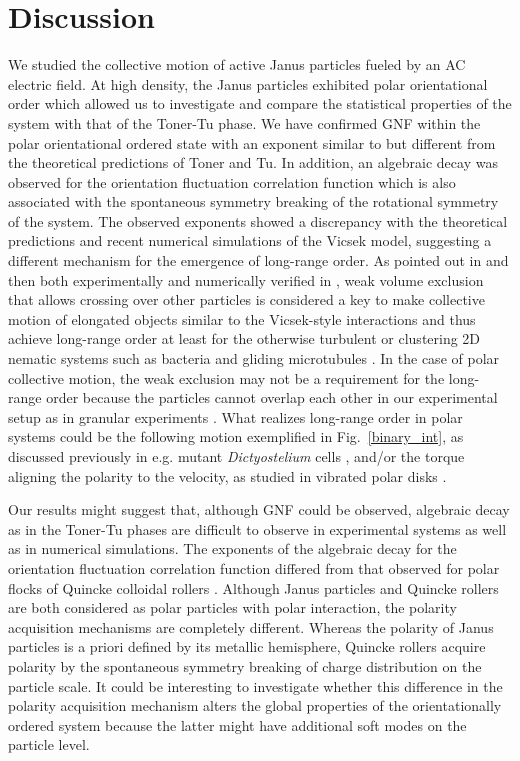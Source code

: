 \documentclass[%
 reprint,
 amsmath,amssymb,
 aps,
 floatfix
]{revtex4-2}
\begin{document}
\section{Discussion}
We studied the collective motion of active Janus particles fueled by an AC electric field. 
At high density, the Janus particles exhibited polar orientational order which allowed us to investigate and compare the statistical properties of the system with that of the Toner-Tu phase.
We have confirmed GNF within the polar orientational ordered state with an exponent similar to but different from the theoretical predictions of Toner and Tu.
In addition, an algebraic decay was observed for the orientation fluctuation correlation function which is also associated with the spontaneous symmetry breaking of the rotational symmetry of the system.
The observed exponents showed a discrepancy with the theoretical predictions and recent numerical simulations \cite{benoit2019} of the Vicsek model, suggesting a different mechanism for the emergence of long-range order.
As pointed out in \cite{nishiguchi2017} and then both experimentally and numerically verified in \cite{shi2018, tanida2020}, weak volume exclusion that allows crossing over other particles is considered a key to make collective motion of elongated objects similar to the Vicsek-style interactions and thus achieve long-range order at least for the otherwise turbulent or clustering 2D nematic systems such as bacteria and gliding microtubules \cite{nishiguchi2017,tanida2020}. In the case of polar collective motion, the weak exclusion may not be a requirement for the long-range order because the particles cannot overlap each other in our experimental setup as in granular experiments \cite{dauchot2013, ramaswamy2020}. What realizes long-range order in polar systems could be the following motion exemplified in Fig.~\ref{binary_int}, as discussed previously in e.g. mutant {\it Dictyostelium} cells \cite{shibata2019}, and/or the torque aligning the polarity to the velocity, as studied in vibrated polar disks \cite{lam2015}.

Our results might suggest that, although GNF could be observed, algebraic decay as in the Toner-Tu phases are difficult to observe in experimental systems as well as in numerical simulations.
The exponents of the algebraic decay for the orientation fluctuation correlation function differed from that observed for polar flocks of Quincke colloidal rollers \cite{bartolo2018}.
Although Janus particles and Quincke rollers are both considered as polar particles with polar interaction, the polarity acquisition mechanisms are completely different. Whereas the polarity of Janus particles is a priori defined by its metallic hemisphere, Quincke rollers acquire polarity by the spontaneous symmetry breaking of charge distribution on the particle scale.
It could be interesting to investigate whether this difference in the polarity acquisition mechanism alters the global properties of the orientationally ordered system because the latter might have additional soft modes on the particle level.
\end{document}
